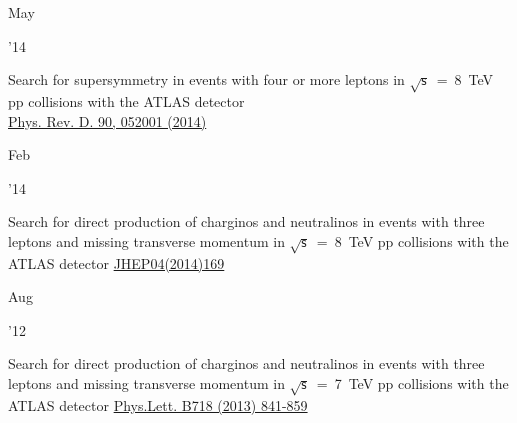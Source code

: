 \documentclass[]{cv} %
\begin{document}
\begin{entrylist}
  \entry
  {\parbox[t]{\parboxWidthOne}{May}\parbox[t]{\parboxWidthTwo}{\hfill '14}}
  {Search for supersymmetry in events with four or more leptons in $\sqrt{\mathsf{s}}$~=~8~TeV pp collisions with the ATLAS detector\\}
  {\href{https://journals.aps.org/prd/abstract/10.1103/PhysRevD.90.052001}{Phys. Rev. D. 90, 052001 (2014)}}
  {\vspace*{\spacingPubs}}

  \entry
  {\parbox[t]{\parboxWidthOne}{Feb}\parbox[t]{\parboxWidthTwo}{\hfill '14}}
  {Search for direct production of charginos and neutralinos in events with three leptons and missing transverse momentum in $\sqrt{\mathsf{s}}$~=~8~TeV pp collisions with the ATLAS detector}
{\href{https://link.springer.com/article/10.1007\%2FJHEP04\%282014\%29169}{JHEP04(2014)169}}
{\vspace*{\spacingPubs}}

    \entry
    {\parbox[t]{\parboxWidthOne}{Aug}\parbox[t]{\parboxWidthTwo}{\hfill '12}}
    {Search for direct production of charginos and neutralinos in events with three leptons and missing transverse momentum in $\sqrt{\mathsf{s}}$~=~7~TeV pp collisions with the ATLAS detector}
  {\href{https://www.sciencedirect.com/science/article/pii/S037026931201204X?via\%3Dihub}{Phys.Lett. B718 (2013) 841-859}}
  {\vspace*{\spacingPubs}}

\end{entrylist}
\end{document}
